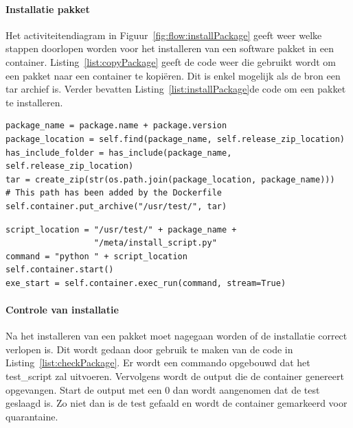 \paragraph{Installatie pakket}
Het activiteitendiagram in Figuur~\ref{fig:flow:installPackage} geeft weer welke stappen doorlopen worden voor het installeren van een software pakket in een container.
Listing~\ref{list:copyPackage} geeft de code weer die gebruikt wordt om een pakket naar een container te kopiëren.
Dit is enkel mogelijk als de bron een tar archief is.
Verder bevatten Listing~\ref{list:installPackage}de code om een pakket te installeren.

\begin{minipage}{\linewidth}
\begin{center}
\begin{lstlisting}[captionpos=b,caption={Kopieer pakket naar container},label={list:copyPackage}]
package_name = package.name + package.version
package_location = self.find(package_name, self.release_zip_location)
has_include_folder = has_include(package_name, self.release_zip_location)
tar = create_zip(str(os.path.join(package_location, package_name)))
# This path has been added by the Dockerfile
self.container.put_archive("/usr/test/", tar)
\end{lstlisting}
\end{center}
\end{minipage}

\begin{minipage}{\linewidth}
\begin{center}
\begin{lstlisting}[captionpos=b,caption={Installatie van een pakket},label={list:installPackage}]
script_location = "/usr/test/" + package_name + 
                  "/meta/install_script.py"
command = "python " + script_location
self.container.start()
exe_start = self.container.exec_run(command, stream=True)
\end{lstlisting}
\end{center}
\end{minipage}

\paragraph{Controle van installatie}
Na het installeren van een pakket moet nagegaan worden of de installatie correct verlopen is.
Dit wordt gedaan door gebruik te maken van de code in Listing~\ref{list:checkPackage}.
Er wordt een commando opgebouwd dat het test\_script zal uitvoeren.
Vervolgens wordt de output die de container genereert opgevangen.
Start de output met een 0 dan wordt aangenomen dat de test geslaagd is.
Zo niet dan is de test gefaald en wordt de container gemarkeerd voor quarantaine.

